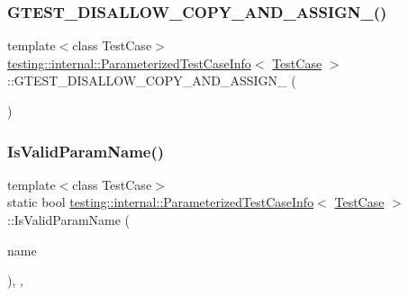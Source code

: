 \subsubsection{\texorpdfstring{GTEST\_DISALLOW\_COPY\_AND\_ASSIGN\_()}{GTEST\_DISALLOW\_COPY\_AND\_ASSIGN\_()}}
{\footnotesize\ttfamily template$<$class Test\+Case$>$ \\
\mbox{\hyperlink{classtesting_1_1internal_1_1_parameterized_test_case_info}{testing\+::internal\+::\+Parameterized\+Test\+Case\+Info}}$<$ \mbox{\hyperlink{classtesting_1_1_test_case}{Test\+Case}} $>$\+::G\+T\+E\+S\+T\+\_\+\+D\+I\+S\+A\+L\+L\+O\+W\+\_\+\+C\+O\+P\+Y\+\_\+\+A\+N\+D\+\_\+\+A\+S\+S\+I\+G\+N\+\_\+ (\begin{DoxyParamCaption}\item[{\mbox{\hyperlink{classtesting_1_1internal_1_1_parameterized_test_case_info}{Parameterized\+Test\+Case\+Info}}$<$ \mbox{\hyperlink{classtesting_1_1_test_case}{Test\+Case}} $>$}]{ }\end{DoxyParamCaption})\hspace{0.3cm}{\ttfamily [private]}}

\mbox{\label{classtesting_1_1internal_1_1_parameterized_test_case_info_a2e5ef36510c01934c07889a5f60e9ed8}} 
\subsubsection{\texorpdfstring{IsValidParamName()}{IsValidParamName()}}
{\footnotesize\ttfamily template$<$class Test\+Case$>$ \\
static bool \mbox{\hyperlink{classtesting_1_1internal_1_1_parameterized_test_case_info}{testing\+::internal\+::\+Parameterized\+Test\+Case\+Info}}$<$ \mbox{\hyperlink{classtesting_1_1_test_case}{Test\+Case}} $>$\+::Is\+Valid\+Param\+Name (\begin{DoxyParamCaption}\item[{const std\+::string \&}]{name }\end{DoxyParamCaption})\hspace{0.3cm}{\ttfamily [inline]}, {\ttfamily [static]}, {\ttfamily [private]}}

